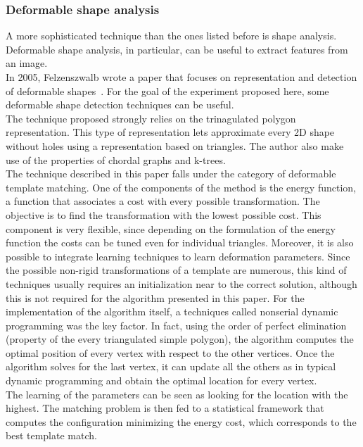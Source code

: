 \documentclass[conference]{IEEEtran}
\begin{document}
		\subsubsection{Deformable shape analysis}
		
			A more sophisticated technique than the ones listed before is shape analysis. Deformable shape analysis, in particular, can be useful to extract features from an image.\\
			In 2005, Felzenszwalb wrote a paper that focuses on representation and detection of deformable shapes~\cite{4}. For the goal of the experiment proposed here, some deformable shape 
			detection techniques can be useful. \\
			The technique proposed strongly relies on the trinagulated polygon representation. This type of representation lets approximate every 2D shape without holes using a representation based on triangles. 
			The author also make use of the properties of chordal graphs and k-trees.\\
			The technique described in this paper falls under the category of deformable template matching. One of the components of the method is the energy function, a function that associates a cost with every 
			possible transformation. The objective is to find the transformation with the lowest possible cost. This component is very flexible, since depending on the formulation of the energy function the costs 
			can be tuned even for individual triangles. Moreover, it is also possible to integrate learning techniques to learn deformation parameters.
			Since the possible non-rigid transformations of a template are numerous, this kind of techniques usually requires an initialization near to the correct solution, 
			although this is not required for the algorithm presented in this paper. 
			For the implementation of the algorithm itself, a techniques called nonserial dynamic programming was the key factor. In fact, using the order of perfect elimination (property of the every triangulated 
			simple polygon), the algorithm computes the optimal position of every vertex with respect to the other vertices. Once the algorithm solves for the last vertex, it can 
			update all the others as in typical dynamic programming and obtain the optimal location for every vertex.\\
			The learning of the parameters can be seen as looking for the location with the highest. The matching problem is then fed to a statistical framework that computes the configuration minimizing the 
			energy cost, which corresponds to the best template match.
			
\end{document}
